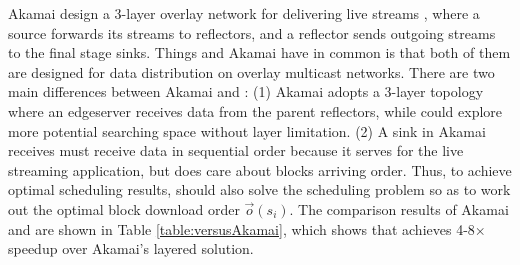 Akamai design a 3-layer overlay network for delivering live streams \cite{Andreev2013Designing}, where a source forwards its streams to reflectors, and a reflector sends outgoing streams to the final stage sinks. Things \name and Akamai have in common is that both of them are designed for data distribution on overlay multicast networks. There are two main differences  between Akamai and \name: (1) Akamai adopts a 3-layer topology where an edgeserver receives data from the parent reflectors, while \name could explore more potential searching space without layer limitation. (2) A sink in Akamai receives must receive data in sequential order because it serves for the live streaming application, but \name does care about blocks arriving order. Thus, to achieve optimal scheduling results, \name should also solve the scheduling problem so as to work out the optimal block download order $\overrightarrow{o}(s_i)$. The comparison results of Akamai and \name are shown in Table \ref{table:versusAkamai}, which shows that \name achieves 4-8$\times$ speedup over Akamai's layered solution.

\begin{table}[htbp]
\begin{center}
\end{center}
\vspace{-0.4cm}
\caption{Completion time of PieBridge and Akamai.}
\label{table:versusAkamai}
\end{table}


